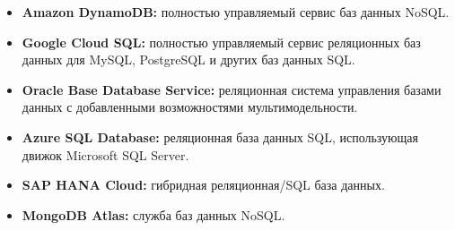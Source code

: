 \begin{itemize}
\item \textbf{Amazon DynamoDB:} полностью управляемый сервис баз данных NoSQL.
\item \textbf{Google Cloud SQL:} полностью управляемый сервис реляционных баз данных для MySQL, PostgreSQL и других баз данных SQL.
\item \textbf{Oracle Base Database Service:} реляционная система управления базами данных с добавленными возможностями мультимодельности.
\item \textbf{Azure SQL Database:} реляционная база данных SQL, использующая движок Microsoft SQL Server.
\item \textbf{SAP HANA Cloud:} гибридная реляционная/SQL база данных.
\item \textbf{MongoDB Atlas:} служба баз данных NoSQL.
\end{itemize}
	
